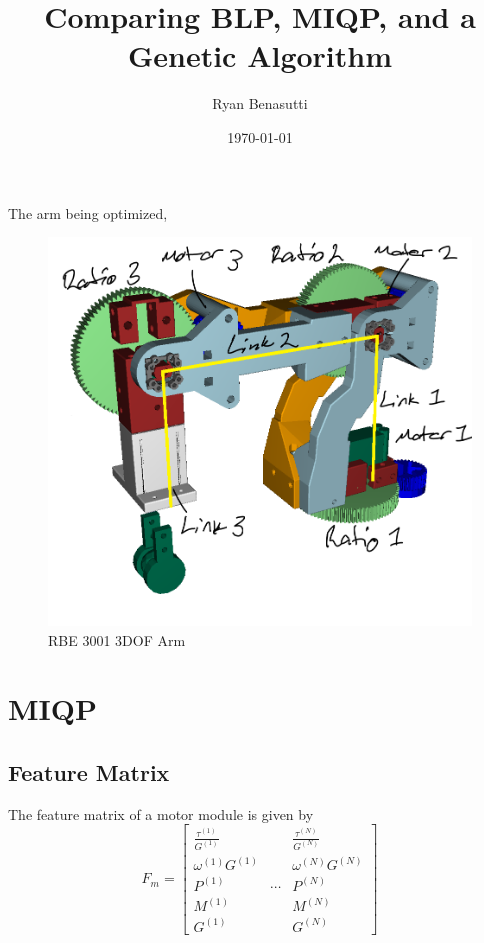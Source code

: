 \documentclass{article}
\title{Comparing BLP, MIQP, and a Genetic Algorithm}
\author{Ryan Benasutti}
\date{\today}
\begin{document}
\maketitle

The arm being optimized,
\begin{figure}[h]
    \centering
    \includegraphics[scale=0.3]{annotated-arm.png}
    \caption{RBE 3001 3DOF Arm}
    \label{fig:annotated_arn}
\end{figure}

\FloatBarrier{}
\section{MIQP}

\FloatBarrier{}
\subsection{Feature Matrix}

The feature matrix of a motor module is given by
\begin{equation}
    F_m =
    \begin{bmatrix}
        \frac{\tau^{(1)}}{G^{(1)}} & & \frac{\tau^{(N)}}{G^{(N)}} \\[6pt]
        \omega^{(1)} G^{(1)} & & \omega^{(N)} G^{(N)} \\[6pt]
        P^{(1)} & \cdots & P^{(N)} \\[6pt]
        M^{(1)} & & M^{(N)} \\[6pt]
        G^{(1)} & & G^{(N)}
    \end{bmatrix}
\end{equation}
\end{document}

